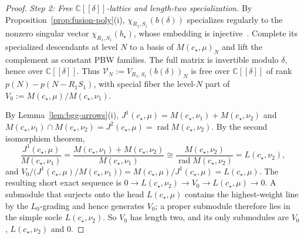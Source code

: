 \documentclass[twoside,10pt]{article}
\numberwithin{equation}{section}
\theoremstyle{slbody}
\theoremstyle{definition}
\theoremstyle{remark}
\newcommand{\rad}{\operatorname{rad}}
\begin{document}
\begin{proof}
\emph{Step 2: Free \(\mathbb{C}[[\delta]]\)-lattice and length-two specialization.}
By Proposition~\ref{prop:fusion-poly}(i), \(\chi_{R_1,S_1}(b(\delta))\) specializes
regularly to the nonzero singular vector \(\chi_{R_1,S_1}(b_\star)\), whose
embedding is injective~\cite[the paragraph preceding Corollary~5.2]{IoharaKoga2011}.
Complete its specialized descendants at level \(N\) to a basis of
\(M(c_\star,\mu)_N\) and lift the complement as constant PBW families.  The
full matrix is invertible modulo \(\delta\), hence over \(\mathbb{C}[[\delta]]\).
Thus \(\mathcal{V}_N:=V_{R_1,S_1}(b(\delta))_N\) is free over \(\mathbb{C}[[\delta]]\) of
rank \(p(N)-p(N-R_1S_1)\), with special fiber the level-\(N\) part of
\(V_0:=M(c_\star,\mu)/M(c_\star,\nu_1)\).

By Lemma~\ref{lem:bgg-arrows}(i), \(J^1(c_\star,\mu)=M(c_\star,\nu_1)+M(c_\star,\nu_2)\)
and \(M(c_\star,\nu_1)\cap M(c_\star,\nu_2)=J^2(c_\star,\mu)=\rad M(c_\star,\nu_2)\).
By the second isomorphism theorem,
\[
 \frac{J^1(c_\star,\mu)}{M(c_\star,\nu_1)}
 =\frac{M(c_\star,\nu_1)+M(c_\star,\nu_2)}{M(c_\star,\nu_1)}
 \cong\frac{M(c_\star,\nu_2)}{\rad M(c_\star,\nu_2)}
 =L(c_\star,\nu_2),
\]
and \(V_0/\bigl(J^1(c_\star,\mu)/M(c_\star,\nu_1)\bigr)
=M(c_\star,\mu)/J^1(c_\star,\mu)=L(c_\star,\mu)\).  The resulting short exact
sequence is \(0\to L(c_\star,\nu_2)\to V_0\to L(c_\star,\mu)\to0\).  A
submodule that surjects onto the head \(L(c_\star,\mu)\) contains the
highest-weight line by the \(L_0\)-grading and hence generates \(V_0\); a proper
submodule therefore lies in the simple socle \(L(c_\star,\nu_2)\).  So \(V_0\)
has length two, and its only submodules are \(V_0\), \(L(c_\star,\nu_2)\)
and \(0\).


\end{proof}
\end{document}
